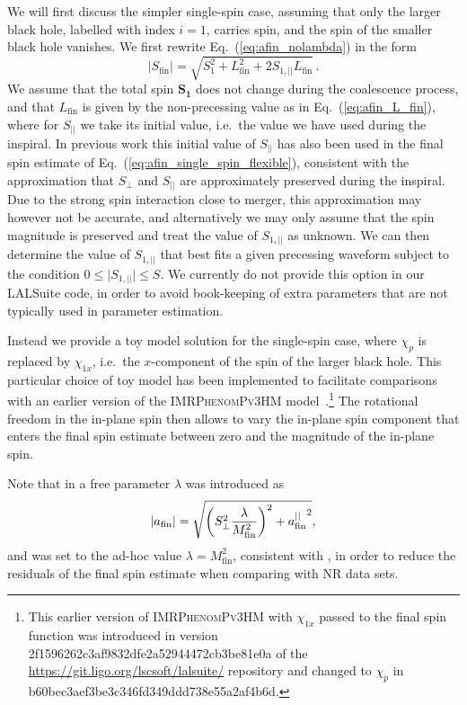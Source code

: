 \documentclass[%
aps,
prd,
amssymb,
amsmath,
amsfonts,
eqsecnum,
showpacs,
nofootinbib,
floatfix,
twocolumn,
twoside,
a4paper,
superscriptaddress
]{revtex4-1}
\newcommand{\phPvthreehm}{\textsc{IMRPhenomPv3HM}\xspace}
\begin{document}
We will first discuss the simpler single-spin case,
assuming that only the larger black hole, labelled with index $i=1$, carries spin, and the spin of the smaller black hole vanishes. We first rewrite  Eq.~(\ref{eq:afin_nolambda}) in the form 
\begin{equation}
    \label{eq:afin_single_spin_flexible}
\vert S_\mathrm{fin} \vert = \sqrt{S_{1}^2 +  L_\mathrm{fin}^2 + 2 S_{1,\vert\vert} L_\mathrm{fin}} \,.
\end{equation}
We assume that the total spin $\mathbf{S_{1}}$ does not change during the coalescence process, and that $L_\mathrm{fin}$ is given by the non-precessing value as in Eq.~(\ref{eq:afin_L_fin}), where for $S_{\vert\vert}$ we take its initial value, i.e.~the value we have used during the inspiral.
%
In previous work \cite{Hannam:2013oca,Bohe:PPv2} this initial value of $S_{\vert\vert}$ has also been used
in the final spin estimate of Eq.~(\ref{eq:afin_single_spin_flexible}),
consistent with the approximation that  $S_\perp$ and $S_{\vert\vert}$ are approximately preserved during the inspiral.
Due to the strong spin interaction close to merger, this approximation may however not be accurate, and alternatively we may only assume that the spin magnitude is preserved and treat the value of $S_{1,\vert\vert}$ as unknown. We can then determine the value of 
$S_{1,\vert\vert}$ that best fits a given precessing waveform subject to the condition $0 \leq \vert S_{1,\vert\vert}\vert \leq S$. We currently do not provide this option in our LALSuite code, in order to avoid book-keeping of extra parameters that are not typically used in parameter estimation.

Instead we provide a toy model solution for the single-spin case, where $\chi_p$ is replaced by $\chi_{1x}$, i.e.~the $x$-component of the spin of the larger black hole.
This particular choice of toy model has been implemented to facilitate comparisons with an earlier version of the \phPvthreehm model~\cite{Khan:2019kot}.\footnote{This earlier version of \phPvthreehm with $\chi_{1x}$ passed to the final spin function was introduced in version 2f1596262c3af9832dfe2a52944472cb3be81e0a of the \url{https://git.ligo.org/lscsoft/lalsuite/} repository and changed to $\chi_p$  in  b60bec3aef3be3c346fd349ddd738e55a2af4b6d.}
The rotational freedom in the in-plane spin then allows to vary the in-plane spin component that enters the final spin estimate between zero and the magnitude of the in-plane spin.

Note that in \cite{Hannam:2013oca,Bohe:PPv2} a free parameter $\lambda$ was introduced as
\begin{equation}\label{eq:afin}
\vert a_\mathrm{fin} \vert = \sqrt{\left(S_\perp^2 \frac{\lambda}{M_\mathrm{fin}^2}\right)^2+ {a_{\rm fin}^{\vert\vert}}^2},
\end{equation}
and was set to the ad-hoc value $\lambda = M_\mathrm{fin}^2$, consistent with \cite{Rezzolla:2007rz}, in order to reduce the residuals of the final spin estimate when comparing with NR data sets.
\end{document}

